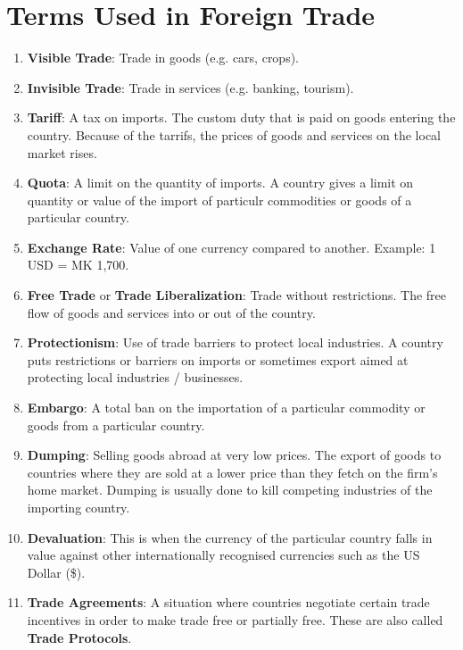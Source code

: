 \documentclass[12pt,a4paper, openany]{book}
\begin{document}
\section{Terms Used in Foreign Trade}
\begin{enumerate}
	\item \textbf{Visible Trade}: Trade in goods (e.g. cars, crops).
	\item \textbf{Invisible Trade}: Trade in services (e.g. banking, tourism).
	\item \textbf{Tariff}: A tax on imports. The custom duty that is paid on goods
	      entering the country. Because of the tarrifs, the prices of goods and services
	      on the local market rises.
	\item \textbf{Quota}: A limit on the quantity of imports. A country gives a limit
	      on quantity or value of the import of particulr commodities or goods of a particular
	      country.
	\item \textbf{Exchange Rate}: Value of one currency compared to another.
	      Example: 1 USD = MK 1,700.
	\item \textbf{Free Trade} or \textbf{Trade Liberalization}: Trade without restrictions. The
	      free flow of goods and services into or out of the country.
	\item \textbf{Protectionism}: Use of trade barriers to protect local industries.
	      A country puts restrictions or barriers on imports or sometimes export aimed at
	      protecting local industries / businesses.
	\item \textbf{Embargo}: A total ban on the importation of a particular commodity or goods from
	      a particular country.
	\item \textbf{Dumping}: Selling goods abroad at very low prices. The export of goods to countries where
	      they are sold at a lower price than they fetch on the firm's home market. Dumping is usually done to kill
	      competing industries of the importing country.
	\item \textbf{Devaluation}: This is when the currency of the particular country falls in value
	      against other internationally recognised currencies such as the US Dollar (\$).
	\item \textbf{Trade Agreements}: A situation where countries negotiate certain trade incentives in order to make
	      trade free or partially free. These are also called \textbf{Trade Protocols}.
\end{enumerate}
\end{document}
